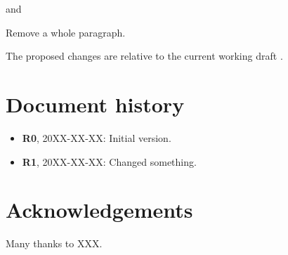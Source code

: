 and

\begin{adjustwidth}{1cm}{1cm}
\begin{removedblock}
Remove a whole paragraph.
\end{removedblock}
\end{adjustwidth}

The proposed changes are relative to the current working draft \cite{Smith20XX}.

\section*{Document history}

\begin{itemize}
\item \textbf{R0}, 20XX-XX-XX: Initial version.
\item \textbf{R1}, 20XX-XX-XX: Changed something.
\end{itemize}

\section*{Acknowledgements}

Many thanks to XXX.

\renewcommand{\bibname}{References}



